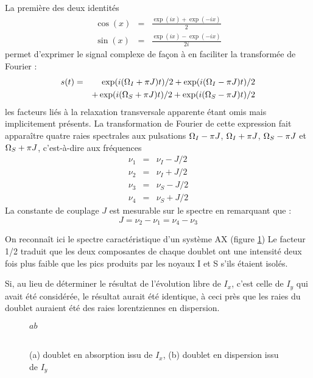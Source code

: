 La première des deux identités
\begin{eqnarray}
\cos(x) & = & \frac{\exp(ix) + \exp(-ix)}{2} \\
\sin(x) & = & \frac{\exp(ix) - \exp(-ix)}{2i}
\end{eqnarray}
permet d'exprimer le signal complexe de façon à 
en faciliter la transformée de Fourier :
\begin{eqnarray}
s(t) & = & \exp(i(\Omega_I + \pi J)t) / 2 + \exp(i(\Omega_I - \pi J)t) / 2 
\nonumber\\
&   & + \exp(i(\Omega_S + \pi J)t) / 2 + \exp(i(\Omega_S - \pi J)t) / 2 
\end{eqnarray}
les facteurs liés à la relaxation transversale apparente étant omis
mais implicitement présents.
La transformation de Fourier de cette expression fait apparaître
quatre raies spectrales aux pulsations $\Omega_I - \pi J$,
$\Omega_I + \pi J$, $\Omega_S - \pi J$ et $\Omega_S + \pi J$,
c'est-à-dire aux fréquences 
\begin{eqnarray}
\nu_1 & = & \nu_I - J/2 \\ 
\nu_2 & = & \nu_I + J/2 \\
\nu_3 & = & \nu_S - J/2 \\
\nu_4 & = & \nu_S + J/2
\end{eqnarray}
La constante de couplage $J$ est mesurable sur le spectre
en remarquant que :
\begin{equation}
J = \nu_2 - \nu_1 = \nu_4 - \nu_3
\end{equation}

On reconnaît ici le spectre caractéristique d'un système AX (figure \ref{fig:ixy-is})
Le facteur 1/2 traduit que les deux 
composantes de chaque doublet ont une intensité deux fois plus 
faible que les pics produits par les 
noyaux I et S s'ils étaient isolés.

Si, au lieu de déterminer le résultat de l'évolution libre de $I_x$,
c'est celle de $I_y$ qui avait été considérée, le résultat aurait été identique,
à ceci près que les raies du doublet auraient été des raies lorentziennes en dispersion.

\begin{figure}[hbt]
\begin{center}
$a$\hspace{1.5in}\hspace{1cm}$b$\hspace{1.5in}$\mbox{ }$\\
 \hspace{1cm}
 \\[1cm]
\end{center}
\caption[Doublets produits par un système $IS$]{
\label{fig:ixy-is}
(a) doublet en absorption issu de $I_x$,
(b) doublet en dispersion issu de $I_y$}
\end{figure}

